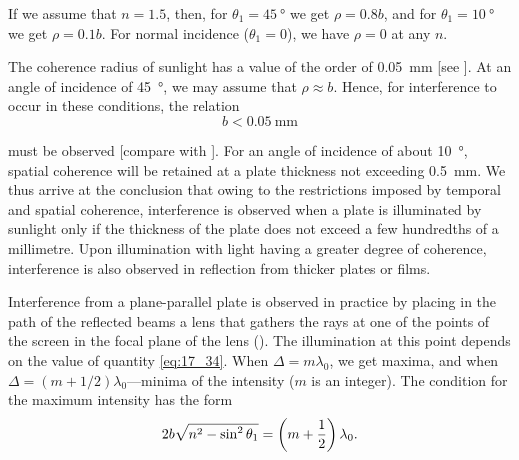 \noindent
If we assume that $n=1.5$, then, for $\theta_1=\SI{45}{\degree}$ we get $\rho=0.8b$, and for $\theta_1=\SI{10}{\degree}$ we get $\rho=0.1b$.
For normal incidence ($\theta_1=0$), we have $\rho=0$ at any $n$.

The coherence radius of sunlight has a value of the order of \SI{0.05}{\milli\metre} [see ].
At an angle of incidence of \SI{45}{\degree}, we may assume that $\rho\approx b$.
Hence, for interference to occur in these conditions, the relation
\begin{equation}\label{eq:17_38}
    b < \SI{0.05}{\milli\metre}
\end{equation}

\noindent
must be observed [compare with ].
For an angle of incidence of about \SI{10}{\degree}, spatial coherence will be retained at a plate thickness not exceeding \SI{0.5}{\milli\metre}.
We thus arrive at the conclusion that owing to the restrictions imposed by temporal and spatial coherence, interference is observed when a plate is illuminated by sunlight only if the thickness of the plate does not exceed a few hundredths of a millimetre.
Upon illumination with light having a greater degree of coherence, interference is also observed in reflection from thicker plates or films.

Interference from a plane-parallel plate is observed in practice by placing in the path of the reflected beams a lens that gathers the rays at one of the points of the screen in the focal plane of the lens ().
The illumination at this point depends on the value of quantity \eqref{eq:17_34}.
When $\Delta=m\lambda_0$, we get maxima, and when $\Delta=(m+1/2)\lambda_0$---minima of the intensity ($m$ is an integer).
The condition for the maximum intensity has the form
\begin{equation}\label{eq:17_39}
    2b \sqrt{n^2 - \sin^2\theta_1} = \left(m + \frac{1}{2}\right) \lambda_0.
\end{equation}

